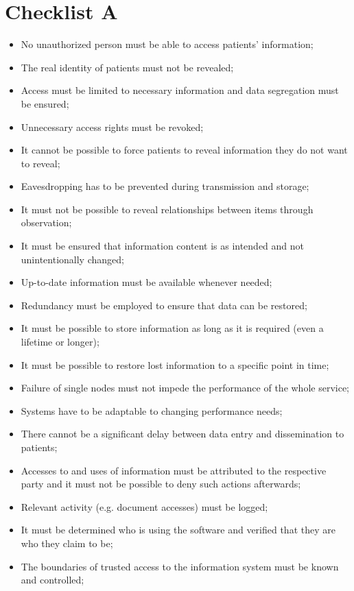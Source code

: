 \section{Checklist A}
\label{security-checklists-a}

\begin{itemize}
	\item No unauthorized person must be able to access patients' information;
	\item The real identity of patients must not be revealed;
	\item Access must be limited to necessary information and data segregation must be ensured;
	\item Unnecessary access rights must be revoked;
	\item It cannot be possible to force patients to reveal information they do not want to reveal;
	\item Eavesdropping has to be prevented during transmission and storage;
	\item It must not be possible to reveal relationships between items through observation;
	\item It must be ensured that information content is as intended and not unintentionally changed;
	\item Up-to-date information must be available whenever needed;
	\item Redundancy must be employed to ensure that data can be restored;
	\item It must be possible to store information as long as it is required (even a lifetime or longer);
	\item It must be possible to restore lost information to a specific point in time;
	\item Failure of single nodes must not impede the performance of the whole service;
	\item Systems have to be adaptable to changing performance needs;
	\item There cannot be a significant delay between data entry and dissemination to patients;
	\item Accesses to and uses of information must be attributed to the respective party and it must not be possible to deny such actions afterwards;
	\item Relevant activity (e.g. document accesses) must be logged;
	\item It must be determined who is using the software and verified that they are who they claim to be;
	\item The boundaries of trusted access to the information system must be known and controlled;

\end{itemize}
